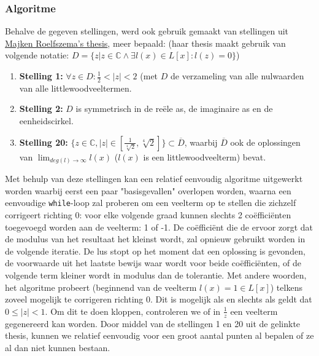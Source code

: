 \documentclass{article}
\begin{document}
\subsubsection{Algoritme}
Behalve de gegeven stellingen, werd ook gebruik gemaakt van stellingen uit \href{https://fse.studenttheses.ub.rug.nl/12857/1/Scriptie__new_.pdf}{Majken Roelfszema's thesis}, meer bepaald: (haar thesis maakt gebruik van volgende notatie: $D = \{ z | z \in \mathbb{C} \land \exists l(x) \in L[x]: l(z) = 0 \}$)
\begin{enumerate}
 \item \textbf{Stelling 1:} $\forall z \in D: \frac{1}{2} < \left|z\right| < 2$ (met $D$ de verzameling van alle nulwaarden van alle littlewoodveeltermen.
 \item \textbf{Stelling 2:} $D$ is symmetrisch in de re\"ele as, de imaginaire as en de eenheids\-cirkel.
 \item \textbf{Stelling 20:} $\{ z \in \mathbb{C}, \left|z\right| \in [ \frac{1}{\sqrt[4]{2}}, \sqrt[4]{2} ] \} \subset \overline{D}$, waarbij $\overline{D}$ ook de oplossingen van $\lim_{deg(l) \to \infty}{l(x)}$ ($l(x)$ is een littlewoodveelterm) bevat.
\end{enumerate}

Met behulp van deze stellingen kan een relatief eenvoudig algoritme uitgewerkt worden waarbij eerst een paar "basisgevallen" overlopen worden, waarna een eenvoudige \verb|while|-loop zal proberen om een veelterm op te stellen die zichzelf corrigeert richting 0: voor elke volgende graad kunnen slechts 2 co\"effici\"enten toegevoegd worden aan de veelterm: 1 of -1. De co\"effici\"ent die de ervoor zorgt dat de modulus van het resultaat het kleinst wordt, zal opnieuw gebruikt worden in de volgende iteratie. De lus stopt op het moment dat een oplossing is gevonden, de voorwaarde uit het laatste bewijs waar wordt voor beide co\"effici\"enten, of de volgende term kleiner wordt in modulus dan de tolerantie. Met andere woorden, het algoritme probeert (beginnend van de veelterm $l(x) = 1 \in L[x]$) telkens zoveel mogelijk te corrigeren richting 0. Dit is mogelijk als en slechts als geldt dat $0 \leq \left|z\right| < 1$. Om dit te doen kloppen, controleren we of in $\frac{1}{z}$ een veelterm gegenereerd kan worden. Door middel van de stellingen 1 en 20 uit de gelinkte thesis, kunnen we relatief eenvoudig voor een groot aantal punten al bepalen of ze al dan niet kunnen bestaan.
\end{document}
